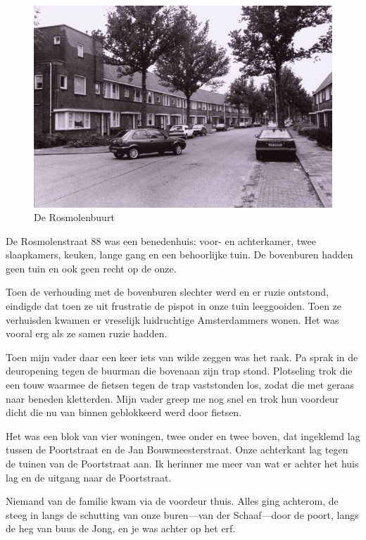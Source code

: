\documentclass[12pt,twoside, openright]{memoir}
\begin{document}
\begin{figure}
\centering
\includegraphics[width=\textwidth]{img/33Rosmolenstraat}
\caption*{\footnotesize De Rosmolenbuurt}
\end{figure}

De Rosmolenstraat 88 was een benedenhuis: voor- en achterkamer, twee slaapkamers, keuken, lange gang en een behoorlijke tuin. De bovenburen hadden geen tuin en ook geen recht op de onze. 

Toen de verhouding met de bovenburen slechter werd en er ruzie ontstond, eindigde dat toen ze uit frustratie de pispot in onze tuin leeggooiden. Toen ze verhuisden kwamen er vreselijk luidruchtige Amsterdammers wonen. Het was vooral erg als ze samen ruzie hadden. 

Toen mijn vader daar een keer iets van wilde zeggen was het raak. Pa sprak in de deuropening tegen de buurman die bovenaan zijn trap stond. Plotseling trok die een touw waarmee de fietsen tegen de trap vaststonden los, zodat die met geraas naar beneden kletterden. Mijn vader greep me nog snel en trok hun voordeur dicht die nu van binnen geblokkeerd werd door fietsen.

Het was een blok van vier woningen, twee onder en twee boven, dat ingeklemd lag tussen de Poortstraat en de Jan Bouwmeesterstraat. Onze achterkant lag tegen de tuinen van de Poortstraat aan. Ik herinner me meer van wat er achter het huis lag en de uitgang naar de Poortstraat. 

Niemand van de familie kwam via de voordeur thuis. Alles ging achterom, de steeg in langs de schutting van onze buren---van der Schaaf---door de poort, langs de heg van buus de Jong, en je was achter op het erf. 
\end{document}
